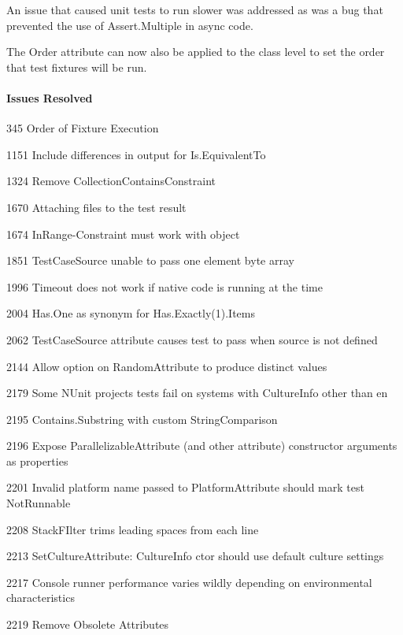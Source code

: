 An issue that caused unit tests to run slower was addressed as was a bug that prevented the use of Assert.\+Multiple in async code.

The Order attribute can now also be applied to the class level to set the order that test fixtures will be run.

\paragraph*{Issues Resolved}


\begin{DoxyItemize}
\item 345 Order of Fixture Execution
\item 1151 Include differences in output for Is.\+Equivalent\+To
\item 1324 Remove Collection\+Contains\+Constraint
\item 1670 Attaching files to the test result
\item 1674 In\+Range-\/\+Constraint must work with object
\item 1851 Test\+Case\+Source unable to pass one element byte array
\item 1996 Timeout does not work if native code is running at the time
\item 2004 Has.\+One as synonym for Has.\+Exactly(1).Items
\item 2062 Test\+Case\+Source attribute causes test to pass when source is not defined
\item 2144 Allow option on Random\+Attribute to produce distinct values
\item 2179 Some N\+Unit project\textquotesingle{}s tests fail on systems with Culture\+Info other than en
\item 2195 Contains.\+Substring with custom String\+Comparison
\item 2196 Expose Parallelizable\+Attribute (and other attribute) constructor arguments as properties
\item 2201 Invalid platform name passed to Platform\+Attribute should mark test Not\+Runnable
\item 2208 Stack\+F\+Ilter trims leading spaces from each line
\item 2213 Set\+Culture\+Attribute\+: Culture\+Info ctor should use default culture settings
\item 2217 Console runner performance varies wildly depending on environmental characteristics
\item 2219 Remove Obsolete Attributes

\end{DoxyItemize}
